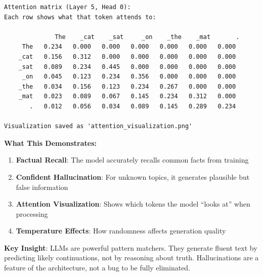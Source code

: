 \begin{verbatim}
Attention matrix (Layer 5, Head 0):
Each row shows what that token attends to:

              The    _cat    _sat     _on    _the    _mat       .
     The   0.234   0.000   0.000   0.000   0.000   0.000   0.000
    _cat   0.156   0.312   0.000   0.000   0.000   0.000   0.000
    _sat   0.089   0.234   0.445   0.000   0.000   0.000   0.000
     _on   0.045   0.123   0.234   0.356   0.000   0.000   0.000
    _the   0.034   0.156   0.123   0.234   0.267   0.000   0.000
    _mat   0.023   0.089   0.067   0.145   0.234   0.312   0.000
       .   0.012   0.056   0.034   0.089   0.145   0.289   0.234

Visualization saved as 'attention_visualization.png'
\end{verbatim}

\textbf{What This Demonstrates:}

\begin{enumerate}
\item \textbf{Factual Recall}: The model accurately recalls common facts from training
\item \textbf{Confident Hallucination}: For unknown topics, it generates plausible but false information
\item \textbf{Attention Visualization}: Shows which tokens the model ``looks at'' when processing
\item \textbf{Temperature Effects}: How randomness affects generation quality
\end{enumerate}

\textbf{Key Insight}: LLMs are powerful pattern matchers. They generate fluent text by predicting likely continuations, not by reasoning about truth. Hallucinations are a feature of the architecture, not a bug to be fully eliminated.
